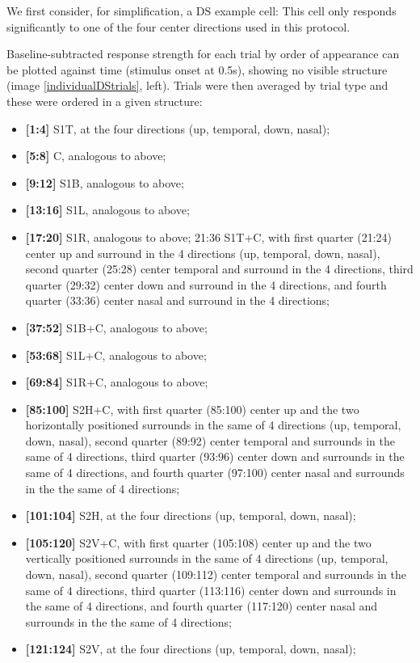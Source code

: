 We first consider, for simplification, a DS example cell: This cell only responds significantly to one of the four center directions used in this protocol.

Baseline-subtracted response strength for each trial by order of appearance can be plotted against time (stimulus onset at 0.5s), showing no visible structure (image \ref{individualDStrials}, left). 
Trials were then averaged by trial type and these were ordered in a given structure:

\begin{itemize}
\item \textbf{[1:4]} S1T, at the four directions (up, temporal, down, nasal); 
\item \textbf{[5:8]} C, analogous to above; 
\item \textbf{[9:12]} S1B, analogous to above;
\item \textbf{[13:16]} S1L, analogous to above;
\item \textbf{[17:20]} S1R, analogous to above; 
21:36 S1T+C, with first quarter (21:24) center up and surround in the 4 directions (up, temporal, down, nasal), second quarter (25:28) center temporal and surround in the 4 directions, third quarter (29:32) center down and surround in the 4 directions, and fourth quarter (33:36) center nasal and surround in the 4 directions;
\item \textbf{[37:52]} S1B+C, analogous to above;
\item \textbf{[53:68]} S1L+C, analogous to above;
\item \textbf{[69:84]} S1R+C, analogous to above;
\item \textbf{[85:100]} S2H+C, with first quarter (85:100) center up and the two horizontally positioned surrounds in the same of 4 directions (up, temporal, down, nasal), second quarter (89:92) center temporal and surrounds in the same of 4 directions, third quarter (93:96) center down and surrounds in the same of 4 directions, and fourth quarter (97:100) center nasal and surrounds in the the same of 4 directions;
\item \textbf{[101:104]} S2H, at the four directions (up, temporal, down, nasal);
\item \textbf{[105:120]} S2V+C, with first quarter (105:108) center up and the two vertically positioned surrounds in the same of 4 directions (up, temporal, down, nasal), second quarter (109:112) center temporal and surrounds in the same of 4 directions, third quarter (113:116) center down and surrounds in the same of 4 directions, and fourth quarter (117:120) center nasal and surrounds in the the same of 4 directions;
\item \textbf{[121:124]} S2V, at the four directions (up, temporal, down, nasal);
\end{itemize}


